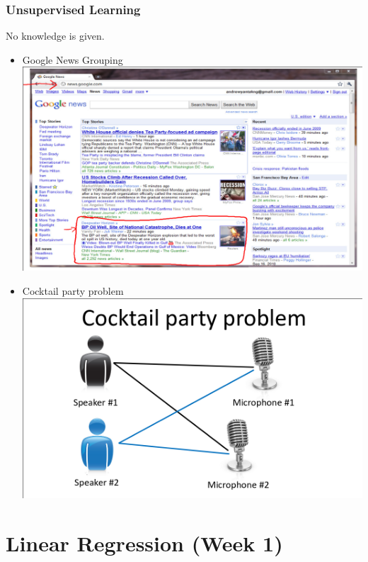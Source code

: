 \documentclass[11pt]{article}
\begin{document}
\subsubsection*{Unsupervised Learning}
\label{sec-2-2-2}
No knowledge is given.
\begin{itemize}
\item Google News Grouping
\label{sec-2-2-2-1}
\includegraphics[width=.9\linewidth]{./images/screenshot-03.png}
\item Cocktail party problem
\label{sec-2-2-2-2}
\includegraphics[width=.9\linewidth]{./images/screenshot-04.png}
\end{itemize}
\section*{Linear Regression (Week 1)}
\label{sec-3}
\end{document}
